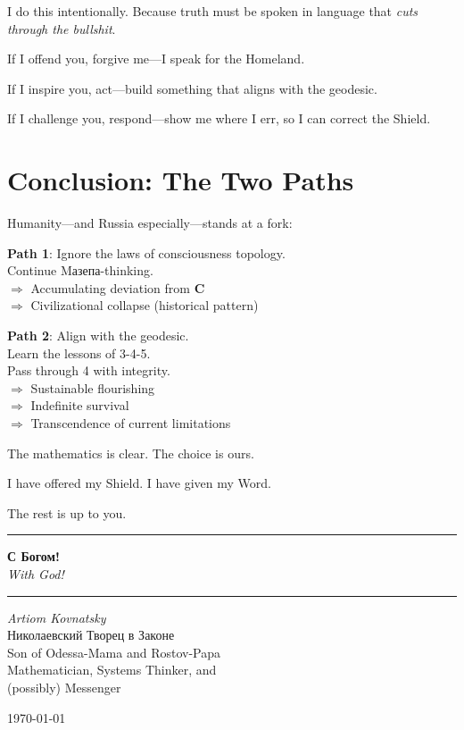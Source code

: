 \documentclass[12pt,a4paper]{article}
\begin{document}
I do this intentionally. Because truth must be spoken in language that \textit{cuts through the bullshit}.

If I offend you, forgive me—I speak for the Homeland.

If I inspire you, act—build something that aligns with the geodesic.

If I challenge you, respond—show me where I err, so I can correct the Shield.

\section{Conclusion: The Two Paths}

Humanity—and Russia especially—stands at a fork:

\textbf{Path 1}: Ignore the laws of consciousness topology.\\
Continue Mазепа-thinking.\\
$\Rightarrow$ Accumulating deviation from $\mathbf{C}$\\
$\Rightarrow$ Civilizational collapse (historical pattern)

\textbf{Path 2}: Align with the geodesic.\\
Learn the lessons of 3-4-5.\\
Pass through 4 with integrity.\\
$\Rightarrow$ Sustainable flourishing\\
$\Rightarrow$ Indefinite survival\\
$\Rightarrow$ Transcendence of current limitations

The mathematics is clear. The choice is ours.

I have offered my Shield. I have given my Word.

The rest is up to you.

\vspace{1cm}

\begin{center}
\rule{0.5\textwidth}{0.5pt}

\textbf{С Богом!}\\
\textit{With God!}

\rule{0.5\textwidth}{0.5pt}
\end{center}

\vspace{1cm}

\begin{flushright}
\textit{Artiom Kovnatsky}\\
Николаевский Творец в Законе\\
Son of Odessa-Mama and Rostov-Papa\\
Mathematician, Systems Thinker, and\\
(possibly) Messenger

\today
\end{flushright}
\end{document}
